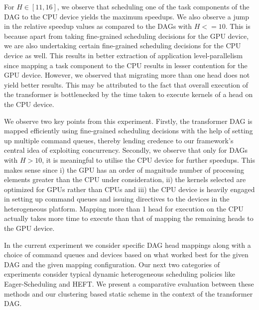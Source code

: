 	\par For $H \in [11,16]$, we observe that scheduling one of the task components of the DAG to the CPU device yields the maximum speedups.  We also observe a jump in the relative speedup values as compared to the DAGs with $H <=10$. This is because apart from taking fine-grained scheduling decisions for the GPU device, we are also undertaking certain fine-grained scheduling decisions for the CPU device as well. This results in better extraction of application level-parallelism since mapping a task component to the CPU results in lesser contention for the GPU device. However, we observed that migrating more than one head does not yield better results. This may be attributed to the fact that overall execution of the transformer is bottlenecked by the time taken to execute kernels of a head on the CPU device. 
	\par We observe two key points from this experiment. Firstly, the transformer DAG is mapped efficiently using fine-grained scheduling decisions with the help of setting up multiple command queues, thereby lending credence to our framework's central idea of exploiting concurrency. Secondly, we observe that only for DAGs with $H > 10$, it is meaningful to utilise the CPU device for further speedups. This makes sense since i) the GPU has an order of magnitude number of processing elements greater than the CPU under consideration, ii) the kernels selected are optimized for GPUs rather than CPUs and iii) the CPU device is heavily engaged in setting up command queues and issuing directives to the devices in the heterogeneous platform.  Mapping more than 1 head for execution on the CPU actually takes more time to execute than that of mapping the remaining heads to the GPU device. 
	\par In the current experiment we consider specific DAG head mappings along with a choice of command queues and devices  based on what worked best for the given DAG and the given mapping configuration. Our next two categories of experiments consider typical dynamic heterogeneous scheduling policies like Eager-Scheduling and HEFT. We present a comparative evaluation between these methods and our clustering based static scheme in the context of the transformer DAG. 
		
